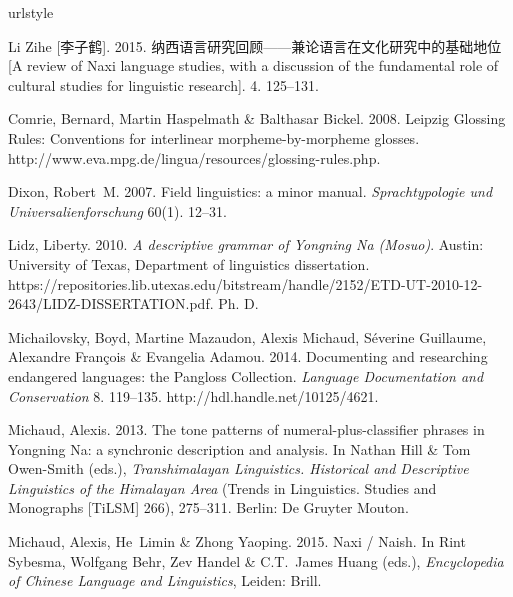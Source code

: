 \documentclass[oldfontcommands,oneside,a4paper,11pt]{article}
\newcommand{\zh}[1]{{\cn #1}}
\begin{document}
	\begin{thebibliography}{7}
		\providecommand{\natexlab}[1]{#1}
		\providecommand{\url}[1]{#1}
		\providecommand{\urlprefix}{}
		\expandafter\ifx\csname urlstyle\endcsname\relax
		\providecommand{\doi}[1]{doi:\discretionary{}{}{}#1}\else
		\providecommand{\doi}{doi:\discretionary{}{}{}\begingroup
			\urlstyle{rm}\Url}\fi
		
		Li Zihe [\zh{李子鹤}]. 2015.
		\newblock
		\zh{纳西语言研究回顾------兼论语言在文化研究中的基础地位}
		[{A} review of {Naxi} language studies, with a discussion of the fundamental
		role of cultural studies for linguistic research].
		\newblock \zh{茶马古道研究期刊} 4. 125--131.
		
		Comrie, Bernard, Martin Haspelmath \& Balthasar Bickel. 2008.
		\newblock Leipzig {Glossing Rules}: Conventions for interlinear morpheme-by-morpheme glosses.
		\newblock
		\urlprefix\url{http://www.eva.mpg.de/lingua/resources/glossing-rules.php}.
		
		Dixon, Robert~M. 2007.
		\newblock Field linguistics: a minor manual.
		\newblock \emph{Sprachtypologie und Universalienforschung} 60(1). 12--31.
		
		Lidz, Liberty. 2010.
		\newblock \emph{A descriptive grammar of {Yongning Na} ({Mosuo})}.
		\newblock Austin: University of Texas, Department of linguistics dissertation.
		\newblock
		\urlprefix\url{https://repositories.lib.utexas.edu/bitstream/handle/2152/ETD-UT-2010-12-2643/LIDZ-DISSERTATION.pdf}.
		\newblock Ph. D.
		
		Michailovsky, Boyd, Martine Mazaudon, Alexis Michaud, S{\'{e}}verine Guillaume,
		Alexandre Fran{\c{c}}ois \& Evangelia Adamou. 2014.
		\newblock Documenting and researching endangered languages: the {Pangloss
			Collection}.
		\newblock \emph{Language Documentation and Conservation} 8. 119--135.
		\newblock \urlprefix\url{http://hdl.handle.net/10125/4621}.
		
		Michaud, Alexis. 2013.
		\newblock The tone patterns of numeral-plus-classifier phrases in {Yongning
			Na}: a synchronic description and analysis.
		\newblock In Nathan Hill \& Tom Owen-Smith (eds.), \emph{Transhimalayan
			{Linguistics}. {Historical} and {Descriptive} {Linguistics} of the
			{Himalayan} {Area}} (Trends in {Linguistics}. {Studies} and {Monographs}
		[{TiLSM}] 266), 275--311. Berlin: De Gruyter Mouton.
		
		Michaud, Alexis, He~Limin \& Zhong Yaoping. 2015.
		\newblock Naxi / {Naish}.
		\newblock In Rint Sybesma, Wolfgang Behr, Zev Handel \& C.T.~James Huang
		(eds.), \emph{Encyclopedia of {Chinese} {Language} and {Linguistics}},
		Leiden: Brill.
		
	\end{thebibliography}
	
\end{document}
